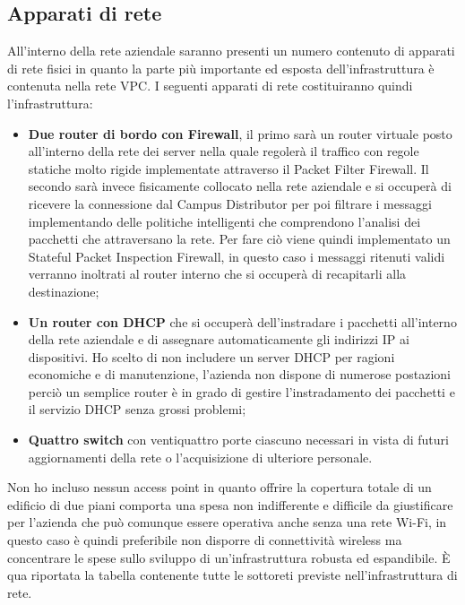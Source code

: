 \subsection{Apparati di rete}
All'interno della rete aziendale saranno presenti un numero contenuto di apparati di rete fisici in quanto la parte più importante ed esposta dell'infrastruttura è contenuta nella rete VPC. I seguenti apparati di rete costituiranno quindi l'infrastruttura: 
\begin{itemize}
    \item \textbf{Due router di bordo con Firewall}, il primo sarà un router virtuale posto all'interno della rete dei server nella quale regolerà il traffico con regole statiche molto rigide implementate attraverso il Packet Filter Firewall. Il secondo sarà invece fisicamente collocato nella rete aziendale e si occuperà di ricevere la connessione dal Campus Distributor per poi filtrare i messaggi implementando delle politiche intelligenti che comprendono l'analisi dei pacchetti che attraversano la rete. Per fare ciò viene quindi implementato un Stateful Packet Inspection Firewall, in questo caso i messaggi ritenuti validi verranno inoltrati al router interno che si occuperà di recapitarli alla destinazione;
    \item \textbf{Un router con DHCP} che si occuperà dell'instradare i pacchetti all'interno della rete aziendale e di assegnare automaticamente gli indirizzi IP ai dispositivi. Ho scelto di non includere un server DHCP per ragioni economiche e di manutenzione, l'azienda non dispone di numerose postazioni perciò un semplice router è in grado di gestire l'instradamento dei pacchetti e il servizio DHCP senza grossi problemi;
    \item \textbf{Quattro switch} con ventiquattro porte ciascuno necessari in vista di futuri aggiornamenti della rete o l'acquisizione di ulteriore personale. 
\end{itemize}
Non ho incluso nessun access point in quanto offrire la copertura totale di un edificio di due piani comporta una spesa non indifferente e difficile da giustificare per l'azienda che può comunque essere operativa anche senza una rete Wi-Fi, in questo caso è quindi preferibile non disporre di connettività wireless ma concentrare le spese sullo sviluppo di un'infrastruttura robusta ed espandibile. È qua riportata la tabella contenente tutte le sottoreti previste nell'infrastruttura di rete. 
